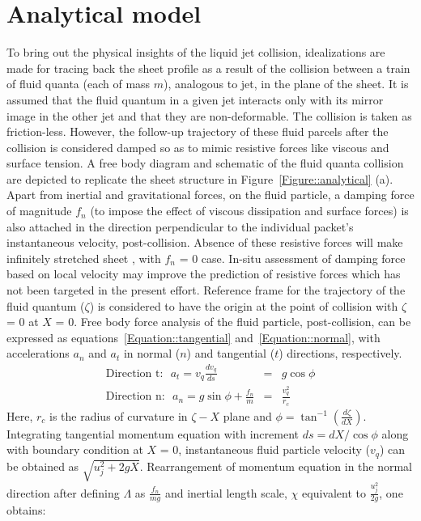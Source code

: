 \section{Analytical model}
To bring out the physical insights of the liquid jet collision, idealizations are made for tracing back the sheet profile as a result of the collision between a train of fluid quanta (each of mass $m$), analogous to jet, in the plane of the sheet. It is assumed that the fluid quantum in a given jet interacts only with its mirror image in the other jet and that they are non-deformable. The collision is taken as friction-less. However, the follow-up trajectory of these fluid parcels after the collision is considered damped so as to mimic resistive forces like viscous and surface tension. A free body diagram and schematic of the fluid quanta collision are depicted to replicate the sheet structure in Figure~\ref{Figure::analytical} (a). Apart from inertial and gravitational forces, on the fluid particle, a damping force of magnitude $f_n$ (to impose the effect of viscous dissipation and surface forces) is also attached in the direction perpendicular to the individual packet's instantaneous velocity, post-collision. Absence of these resistive forces will make infinitely stretched sheet \citep{taylor1960formation}, with $f_n$ = 0 case. In-situ assessment of damping force based on local velocity may improve the prediction of resistive forces which has not been targeted in the present effort. Reference frame for the trajectory of the fluid quantum ($\zeta$) is considered to have the origin at the point of collision with $\zeta$ = 0 at $X$ = 0. Free body force analysis of the fluid particle, post-collision, can be expressed as equations~\ref{Equation::tangential} and~\ref{Equation::normal}, with accelerations $a_n$ and $a_t$ in normal ($n$) and tangential ($t$) directions, respectively.
\begin{subequations}%
	\label{Equation::forceBal}	
	\begin{eqnarray}
	\label{Equation::tangential}
	\text{Direction t:}\:\:\: a_t = v_{q}\frac{dv_{q}}{ds} &=& g\cos\phi\\
	\label{Equation::normal}
	\text{Direction n:}\:\:\: a_n = g\sin\phi + \frac{f_n}{m} &=& \frac{v_{q}^2}{r_c}
	\end{eqnarray}
\end{subequations}
Here, $r_c$ is the radius of curvature in $\zeta-X$ plane and $\phi = \tan^{-1}\left(\frac{d\zeta}{dX}\right)$. Integrating tangential momentum equation with increment $ds = dX/\cos\phi$ along with boundary condition at $X$ = 0, instantaneous fluid particle velocity ($v_{q}$) can be obtained as $\sqrt{u_j^2 + 2gX}$. Rearrangement of momentum equation in the normal direction after defining $\Lambda$ as $\frac{f_n}{mg}$ and inertial length scale, $\chi$ equivalent to $\frac{u_j^2}{2g}$, one obtains:
